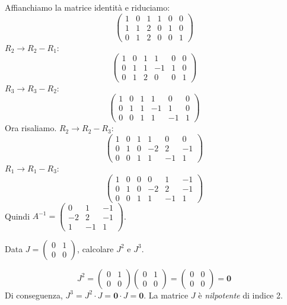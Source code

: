 \begin{solbox}
Affianchiamo la matrice identità e riduciamo:
$$ \left(\begin{array}{ccc|ccc} 
1 & 0 & 1 & 1 & 0 & 0 \\ 
1 & 1 & 2 & 0 & 1 & 0 \\ 
0 & 1 & 2 & 0 & 0 & 1 
\end{array}\right) $$
$R_2 \to R_2 - R_1$:
$$ \left(\begin{array}{ccc|ccc} 1 & 0 & 1 & 1 & 0 & 0 \\ 0 & 1 & 1 & -1 & 1 & 0 \\ 0 & 1 & 2 & 0 & 0 & 1 \end{array}\right) $$
$R_3 \to R_3 - R_2$:
$$ \left(\begin{array}{ccc|ccc} 1 & 0 & 1 & 1 & 0 & 0 \\ 0 & 1 & 1 & -1 & 1 & 0 \\ 0 & 0 & 1 & 1 & -1 & 1 \end{array}\right) $$
Ora risaliamo. $R_2 \to R_2 - R_3$:
$$ \left(\begin{array}{ccc|ccc} 1 & 0 & 1 & 1 & 0 & 0 \\ 0 & 1 & 0 & -2 & 2 & -1 \\ 0 & 0 & 1 & 1 & -1 & 1 \end{array}\right) $$
$R_1 \to R_1 - R_3$:
$$ \left(\begin{array}{ccc|ccc} 1 & 0 & 0 & 0 & 1 & -1 \\ 0 & 1 & 0 & -2 & 2 & -1 \\ 0 & 0 & 1 & 1 & -1 & 1 \end{array}\right) $$
Quindi $A^{-1} = \begin{pmatrix} 0 & 1 & -1 \\ -2 & 2 & -1 \\ 1 & -1 & 1 \end{pmatrix}$.
\end{solbox}

\begin{exercisebox}[title={Esercizio 3: Potenze di Matrici}]
Data $J = \begin{pmatrix} 0 & 1 \\ 0 & 0 \end{pmatrix}$, calcolare $J^2$ e $J^3$.
\end{exercisebox}

\begin{solbox}
$$ J^2 = \begin{pmatrix} 0 & 1 \\ 0 & 0 \end{pmatrix} \begin{pmatrix} 0 & 1 \\ 0 & 0 \end{pmatrix} = \begin{pmatrix} 0 & 0 \\ 0 & 0 \end{pmatrix} = \mathbf{0} $$
Di conseguenza, $J^3 = J^2 \cdot J = \mathbf{0} \cdot J = \mathbf{0}$.
La matrice $J$ è \textit{nilpotente} di indice 2.
\end{solbox}
